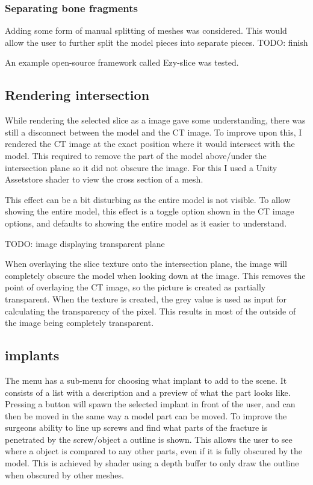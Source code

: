 \documentclass[a4paper]{report}
\begin{document}
\subsubsection{Separating bone fragments}
Adding some form of manual splitting of meshes was considered. This would allow the user to further split the model pieces into separate pieces.
TODO: finish

An example open-source framework called Ezy-slice\cite{aryan} was tested.

\subsection{Rendering intersection}
While rendering the selected slice as a image gave some understanding, there was still a disconnect between the model and the CT image. To improve upon this, I rendered the CT image at the exact position where it would intersect with the model.
This required to remove the part of the model above/under the intersection plane so it did not obscure the image. For this I used a Unity Assetstore shader to view the cross section of a mesh\cite{aldandarawy_unity_2019}.

This effect can be a bit disturbing as the entire model is not visible. To allow showing the entire model, this effect is a toggle option shown in the CT image options, and defaults to showing the entire model as it easier to understand.

TODO: image displaying transparent plane

When overlaying the slice texture onto the intersection plane, the image will completely obscure the model when looking down at the image. This removes the point of overlaying the CT image, so the picture is created as partially transparent. When the texture is created, the grey value is used as input for calculating the transparency of the pixel. This results in most of the outside of the image being completely transparent.

\subsection{implants}
The menu has a sub-menu for choosing what implant to add to the scene. It consists of a list with a description and a preview of what the part looks like. Pressing a button will spawn the selected implant in front of the user, and can then be moved in the same way a model part can be moved.
To improve the surgeons ability to line up screws and find what parts of the fracture is penetrated by the screw/object a outline is shown. This allows the user to see where a object is compared to any other parts, even if it is fully obscured by the model. This is achieved by shader using a depth buffer to only draw the outline when obscured by other meshes\cite{shader depth}.
\end{document}
